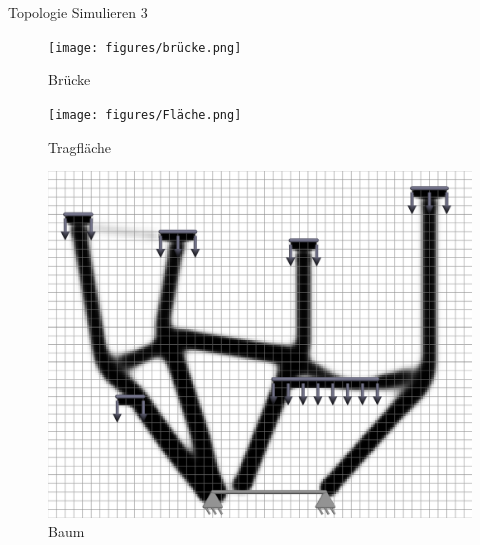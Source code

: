 \documentclass{beamer}
\begin{document}
\begin{frame}{Topologie Simulieren 3}
\begin{figure}[H]
    \begin{minipage}{0.25\textwidth}
        \centering
        \texttt{[image: figures/brücke.png]}
        \caption{Br\"ucke}
        \label{fig:bruecke}
    \end{minipage}\hfill
    \begin{minipage}{0.25\textwidth}
        \centering
        \texttt{[image: figures/Fläche.png]}
        \caption{Tragfl\"ache}
    \end{minipage}\hfill
    \begin{minipage}{0.25\textwidth}
        \centering
        \includegraphics[width=\linewidth]{figures/baum.png}
        \caption{Baum}
    \end{minipage}
\end{figure}

\end{frame}
\end{document}
